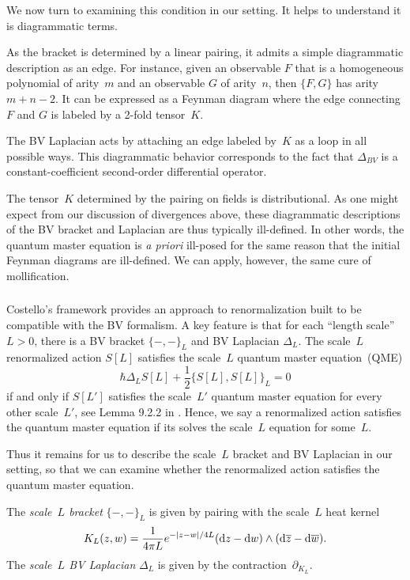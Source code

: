 We now turn to examining this condition in our setting.
It helps to understand it is diagrammatic terms.

As the bracket is determined by a linear pairing,
it admits a simple diagrammatic description as an edge.
For instance, given an observable $F$ that is a homogeneous polynomial of arity~$m$
and an observable $G$ of arity~$n$, 
then $\{F,G\}$ has arity~$m+n-2$.
It can be expressed as a Feynman diagram 
where the edge connecting $F$ and $G$ is labeled by a 2-fold tensor~$K$.

The BV Laplacian acts by attaching an edge labeled by~$K$ as a loop in all possible ways.
This diagrammatic behavior corresponds to the fact that $\Delta_{BV}$ is a constant-coefficient second-order differential operator.

The tensor~$K$ determined by the pairing on fields is distributional.
As one might expect from our discussion of divergences above,
these diagrammatic descriptions of the BV bracket and Laplacian are thus typically ill-defined.
In other words, the quantum master equation is {\em a priori} ill-posed for the same reason that the initial Feynman diagrams are ill-defined.
We can apply, however, the same cure of mollification.

\subsubsection{}

Costello's framework \cite{CosBook} provides an approach to renormalization built to be compatible with the BV formalism.
A key feature is that for each ``length scale''~$L>0$, 
there is a BV bracket $\{-,-\}_L$ and BV Laplacian $\Delta_L$.
The scale~$L$ renormalized action $S[L]$ satisfies the scale~$L$ quantum master equation~(QME)
\[
\hbar \Delta_{L} S[L] + \frac{1}{2}\{S[L],S[L]\}_L = 0
\]
if and only if $S[L']$ satisfies the scale~$L'$ quantum master equation for every other scale~$L'$, see Lemma 9.2.2 in \cite{CosBook}.
Hence, we say a renormalized action satisfies the quantum master equation if its solves the scale~$L$ equation for some~$L$.

Thus it remains for us to describe the scale~$L$ bracket and BV Laplacian in our setting,
so that we can examine whether the renormalized action satisfies the quantum master equation.

\begin{dfn}
The {\em scale~$L$ bracket} $\{-,-\}_L$ is given by pairing with the scale~$L$ heat kernel
\[
K_L(z,w) = \frac{1}{4\pi L} e^{-|z-w|/4L} ({\rm d} z - {\rm d} w) \wedge ({\rm d}\overline{z} - {\rm d}\overline{w}). 
\]
The {\em scale~$L$ BV Laplacian} $\Delta_L$ is given by the contraction~$\partial_{K_L}$.
\end{dfn}

